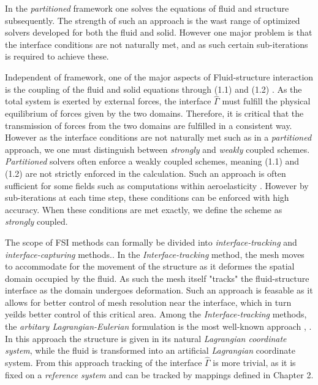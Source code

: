 In the \textit{partitioned} framework one solves the equations of fluid and structure subsequently. The strength of such an approach is the wast range of optimized solvers developed for both the fluid and solid. However one major problem is that the interface conditions are not naturally met, and as such certain sub-iterations is required to achieve these. 

Independent of framework, one of the major aspects of Fluid-structure interaction is the coupling of the fluid and solid equations through (1.1) and (1.2) .  As the total system is exerted by external forces, the interface $\hat{\Gamma}$ must fulfill the physical equilibrium of forces given by the two domains. Therefore, it is critical that the transmission of forces from the two domains are fulfilled in a consistent way. However as the interface conditions are not naturally met such as in a \textit{partitioned} approach, we one must distinguish between \textit{strongly} and \textit{weakly} coupled schemes. \textit{Partitioned} solvers often enforce a weakly coupled schemes, meaning (1.1) and (1.2) are not strictly enforced in the calculation. Such an approach is often sufficient for some fields such as computations within aeroelasticity \cite{Fernandez2009}. However by sub-iterations at each time step, these conditions can be enforced with high accuracy.
When these conditions are met exactly, we define the scheme as \textit{strongly} coupled.  

The scope of FSI methods can formally be divided into \textit{interface-tracking} and \textit{interface-capturing } methods.\cite{Frei2016}. In the \textit{Interface-tracking} method, the mesh moves to accommodate for the movement of the structure as it deformes the spatial domain occupied by the fluid. As such the mesh itself "tracks" the fluid-structure interface as the domain undergoes deformation. Such an approach is feasable as it allows for better control of mesh resolution near the interface, which in turn yeilds better control of this critical area. Among the  \textit{Interface-tracking} methods, the \textit{arbitary Lagrangian-Eulerian} formulation is the most well-known approach \cite{Richter2010a}, \cite{Frei2016}. In this approach the structure is given in its natural \textit{Lagrangian coordinate system}, while the fluid is transformed into an artificial \textit{Lagrangian} coordinate system. From this approach tracking of the interface $\hat{\Gamma}$ is more trivial, as it is fixed on a \textit{reference system} and can be tracked by mappings defined in Chapter 2. \\ \\

